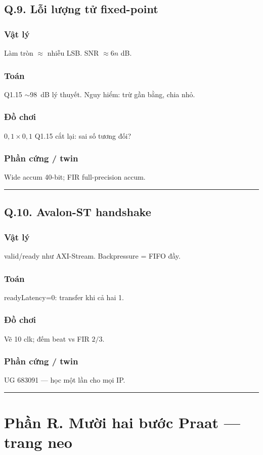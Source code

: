 \subsection*{Q.9. Lỗi lượng tử fixed-point}
\subsubsection*{Vật lý}
Làm tròn $\approx$ nhiễu LSB. SNR $\approx6n$ dB.
\subsubsection*{Toán}
Q1.15 $\sim$98~dB lý thuyết. Nguy hiểm: trừ gần bằng, chia nhỏ.
\subsubsection*{Đồ chơi}
$0{,}1\times0{,}1$ Q1.15 cắt lại: sai số tương đối?
\subsubsection*{Phần cứng / twin}
Wide accum 40-bit; FIR full-precision accum.
\vspace{0.25cm}\hrule\vspace{0.25cm}
\subsection*{Q.10. Avalon-ST handshake}
\subsubsection*{Vật lý}
valid/ready như AXI-Stream. Backpressure = FIFO đầy.
\subsubsection*{Toán}
readyLatency=0: transfer khi cả hai 1.
\subsubsection*{Đồ chơi}
Vẽ 10 clk; đếm beat vs FIR $2/3$.
\subsubsection*{Phần cứng / twin}
UG 683091 --- học một lần cho mọi IP.
\vspace{0.25cm}\hrule\vspace{0.25cm}
\newpage\section*{Phần R. Mười hai bước Praat --- trang neo}
